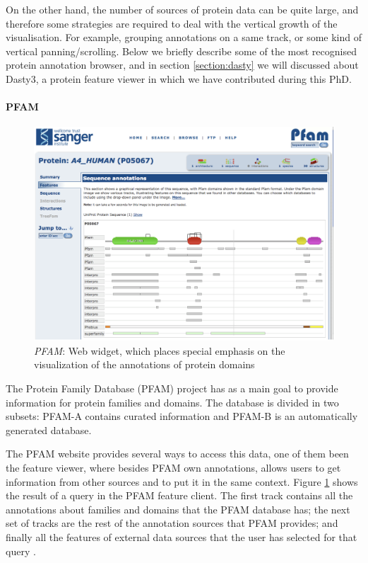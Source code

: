 On the other hand, the number of sources of protein data can be quite large, and therefore some strategies are required to deal with the vertical growth of the visualisation. For example, grouping annotations on a same track, or some kind of vertical panning/scrolling. Below we briefly describe some of the most recognised protein annotation browser, and in section \ref{section:dasty} we will discussed about Dasty3, a protein feature viewer in which we have contributed during this PhD.

\paragraph{PFAM} 

\begin{figure}[ht]
\centering
\includegraphics[width=6in]{figures/pfam.png} 
\caption[PFAM Snapshot] {\emph{PFAM}: Web widget, which places special emphasis on the visualization of the annotations of protein domains}  \label{fig: pfam}
\end{figure}

The Protein Family Database (PFAM) project has as a main goal to provide information for protein families and domains. The database is divided in two subsets: PFAM-A contains curated information and PFAM-B is an automatically generated database. 

The PFAM website provides several ways to access this data, one of them been the feature viewer, where besides PFAM own annotations, allows users to get information from other sources and to put it in the same context. Figure \ref{fig: pfam} shows the result of a query in the PFAM feature client. The first track contains all the annotations about families and domains that the PFAM database has; the next set of tracks are the rest of the annotation sources that PFAM provides; and finally all the features of external data sources that the user has selected for that query \cite{FIN2008}.

